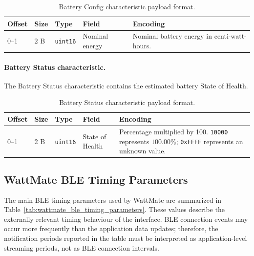 \begin{table}[H]
	\centering
	\small
	\caption{Battery Config characteristic payload format.}
	\label{tab:wattmate_battery_config_payload}
	\begin{tabular}{p{} p{} p{} p{} p{}}
		\toprule
		\textbf{Offset} & \textbf{Size} & \textbf{Type} & \textbf{Field} & \textbf{Encoding} \\
		\midrule
		0--1 &
		2 B &
		\texttt{uint16} &
		Nominal energy &
		Nominal battery energy in centi-watt-hours. \\
		\bottomrule
	\end{tabular}
\end{table}

\paragraph{Battery Status characteristic.}
The Battery Status characteristic contains the estimated battery State of Health.

\begin{table}[H]
	\centering
	\small
	\caption{Battery Status characteristic payload format.}
	\label{tab:wattmate_battery_status_payload}
	\begin{tabular}{p{} p{} p{} p{} p{}}
		\toprule
		\textbf{Offset} & \textbf{Size} & \textbf{Type} & \textbf{Field} & \textbf{Encoding} \\
		\midrule
		0--1 &
		2 B &
		\texttt{uint16} &
		State of Health &
		Percentage multiplied by 100. \texttt{10000} represents \(100.00\%\); \texttt{0xFFFF} represents an unknown value. \\
		\bottomrule
	\end{tabular}
\end{table}



\subsection{WattMate BLE Timing Parameters}
\label{sec:wattmate_ble_timing_parameters}

The main BLE timing parameters used by WattMate are summarized in Table~\ref{tab:wattmate_ble_timing_parameters}. 
These values describe the externally relevant timing behaviour of the interface. 
BLE connection events may occur more frequently than the application data updates; therefore, the notification periods reported in the table must be interpreted as application-level streaming periods, not as BLE connection intervals.

